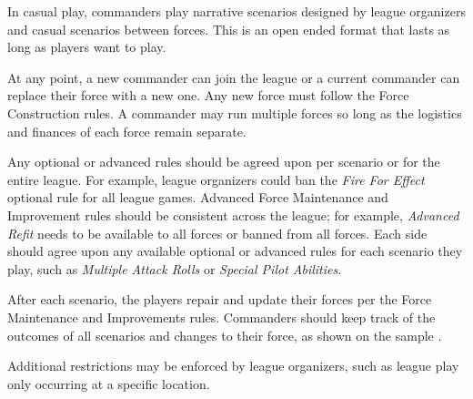 In casual play, commanders play narrative scenarios designed by league organizers and casual scenarios between forces.
This is an open ended format that lasts as long as players want to play.

At any point, a new commander can join the league or a current commander can replace their force with a new one.
Any new force must follow the Force Construction rules.
A commander may run multiple forces so long as the logistics and finances of each force remain separate.

Any optional or advanced rules should be agreed upon per scenario or for the entire league.
For example, league organizers could ban the \emph{Fire For Effect} optional rule for all league games.
Advanced Force Maintenance and Improvement rules should be consistent across the league; for example, \emph{Advanced Refit} needs to be available to all forces or banned from all forces.
Each side should agree upon any available optional or advanced rules for each scenario they play, such as \emph{Multiple Attack Rolls} or \emph{Special Pilot Abilities}.

After each scenario, the players repair and update their forces per the Force Maintenance and Improvements rules.
Commanders should keep track of the outcomes of all scenarios and changes to their force, as shown on the sample .

Additional restrictions may be enforced by league organizers, such as league play only occurring at a specific location.
